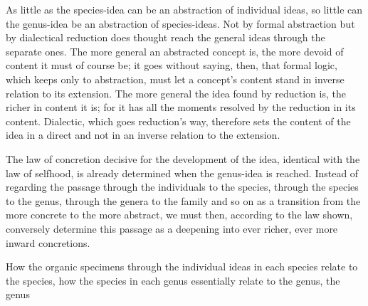 \documentclass[12pt,a4paper]{book}
\begin{document}
As little as the species-idea can be an abstraction of individual ideas, so little
can the genus-idea be an abstraction of species-ideas. Not by formal abstraction
but by dialectical reduction does thought reach the general ideas through the
separate ones. The more general an abstracted concept is, the more devoid of
content it must of course be; it goes without saying, then, that formal logic,
which keeps only to abstraction, must let a concept's content stand in inverse
relation to its extension. The more general the idea found by reduction is, the
richer in content it is; for it has all the moments resolved by the reduction in
its content. Dialectic, which goes reduction's way, therefore sets the content of
the idea in a direct and not in an inverse relation to the extension.

The law of concretion decisive for the development of the idea, identical with the
law of selfhood, is already determined when the genus-idea is reached. Instead of
regarding the passage through the individuals to the species, through the species
to the genus, through the genera to the family and so on as a transition from the
more concrete to the more abstract, we must then, according to the law shown,
conversely determine this passage as a deepening into ever richer, ever more inward
concretions.

How the organic specimens through the individual ideas in each species relate to
the species, how the species in each genus essentially relate to the genus, the
genus
\end{document}
